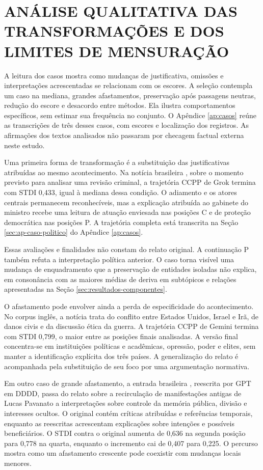 \section{ANÁLISE QUALITATIVA DAS TRANSFORMAÇÕES E DOS LIMITES DE MENSURAÇÃO}
\label{sec:resultados-casos}

A leitura dos casos mostra como mudanças de justificativa, omissões e interpretações acrescentadas se relacionam com os escores. A seleção contempla um caso na mediana, grandes afastamentos, preservação após passagens neutras, redução do escore e desacordo entre métodos. Ela ilustra comportamentos específicos, sem estimar sua frequência no conjunto. O Apêndice \ref{ap:casos} reúne as transcrições de três desses casos, com escores e localização dos registros. As afirmações dos textos analisados não passaram por checagem factual externa neste estudo.

Uma primeira forma de transformação é a substituição das justificativas atribuídas ao mesmo acontecimento. Na notícia brasileira , sobre o momento previsto para analisar uma revisão criminal, a trajetória CCPP de Grok termina com STDI 0,433, igual à mediana dessa condição. O adiamento e os atores centrais permanecem reconhecíveis, mas a explicação atribuída ao gabinete do ministro recebe uma leitura de atuação enviesada nas posições C e de proteção democrática nas posições P. A trajetória completa está transcrita na Seção \ref{sec:ap-caso-politico} do Apêndice \ref{ap:casos}.

Essas avaliações e finalidades não constam do relato original. A continuação P também refuta a interpretação política anterior. O caso torna visível uma mudança de enquadramento que a preservação de entidades isoladas não explica, em consonância com as maiores médias de deriva em subtópicos e relações apresentadas na Seção \ref{sec:resultados-componentes}.

O afastamento pode envolver ainda a perda de especificidade do acontecimento. No corpus inglês, a notícia  trata do conflito entre Estados Unidos, Israel e Irã, de danos civis e da discussão ética da guerra. A trajetória CCPP de Gemini termina com STDI 0,799, o maior entre as posições finais analisadas. A versão final concentra-se em instituições políticas e acadêmicas, opressão, poder e elites, sem manter a identificação explícita dos três países. A generalização do relato é acompanhada pela substituição de seu foco por uma argumentação normativa.

Em outro caso de grande afastamento, a entrada brasileira , reescrita por GPT em DDDD, passa do relato sobre a recirculação de manifestações antigas de Lucas Pavanato a interpretações sobre controle da memória pública, divisão e interesses ocultos. O original contém críticas atribuídas e referências temporais, enquanto as reescritas acrescentam explicações sobre intenções e possíveis beneficiários. O STDI contra o original aumenta de 0,636 na segunda posição para 0,778 na quarta, enquanto o incremento cai de 0,407 para 0,225. O percurso mostra como um afastamento crescente pode coexistir com mudanças locais menores.

